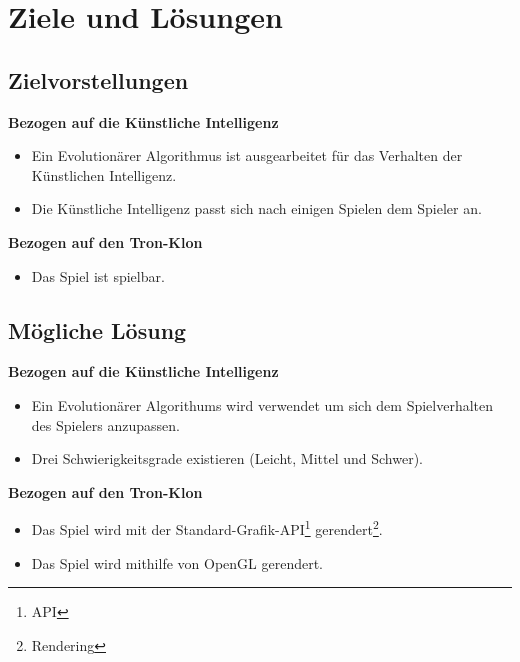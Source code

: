 \pagebreak
\section{Ziele und Lösungen}
\subsection{Zielvorstellungen}
\textbf{Bezogen auf die Künstliche Intelligenz}
\begin{itemize}
	\item Ein Evolutionärer Algorithmus ist ausgearbeitet für das Verhalten der Künstlichen Intelligenz.
	\item Die Künstliche Intelligenz passt sich nach einigen Spielen dem Spieler an.
\end{itemize}
\textbf{Bezogen auf den Tron-Klon}
\begin{itemize}
	\item Das Spiel ist spielbar.
\end{itemize}
\subsection{Mögliche Lösung}
\textbf{Bezogen auf die Künstliche Intelligenz}
\begin{itemize}
	\item Ein Evolutionärer Algorithums wird verwendet um sich dem Spielverhalten des Spielers anzupassen.
	\item Drei Schwierigkeitsgrade existieren (Leicht, Mittel und Schwer).
\end{itemize}
\textbf{Bezogen auf den Tron-Klon}
\begin{itemize}
	\item Das Spiel wird mit der Standard-Grafik-API\footnote{API} gerendert\footnote{Rendering}.
	\item Das Spiel wird mithilfe von OpenGL gerendert.
\end{itemize}